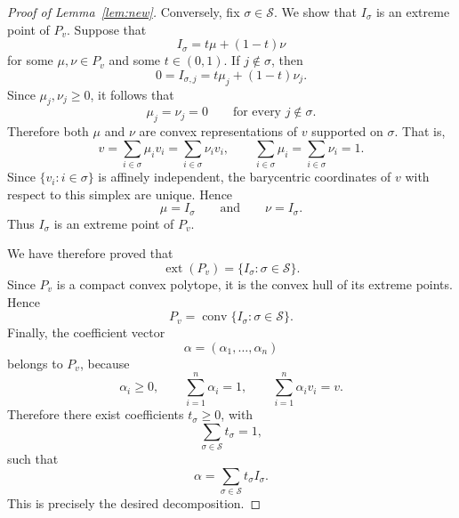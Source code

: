\documentclass[10pt]{amsart}
\theoremstyle{plain}
\theoremstyle{definition}
\let\geq\geqslant
\begin{document}
\begin{proof}[Proof of Lemma~\ref{lem:new}]
Conversely, fix \(\sigma\in\mathcal S\). We show that \(I_\sigma\) is an
extreme point of \(P_v\). Suppose that
\[
I_\sigma=t\mu+(1-t)\nu
\]
for some \(\mu,\nu\in P_v\) and some \(t\in(0,1)\). If \(j\notin\sigma\),
then
\[
0=I_{\sigma,j}=t\mu_j+(1-t)\nu_j.
\]
Since \(\mu_j,\nu_j\geq 0\), it follows that
\[
\mu_j=\nu_j=0
\qquad
\text{for every } j\notin\sigma.
\]
Therefore both \(\mu\) and \(\nu\) are convex representations of \(v\)
supported on \(\sigma\). That is,
\[
v=\sum_{i\in\sigma} \mu_i v_i
=
\sum_{i\in\sigma} \nu_i v_i,
\qquad
\sum_{i\in\sigma}\mu_i
=
\sum_{i\in\sigma}\nu_i
=
1.
\]
Since \(\{v_i:i\in\sigma\}\) is affinely independent, the barycentric
coordinates of \(v\) with respect to this simplex are unique. Hence
\[
\mu=I_\sigma
\qquad\text{and}\qquad
\nu=I_\sigma.
\]
Thus \(I_\sigma\) is an extreme point of \(P_v\).

We have therefore proved that
\[
\operatorname{ext}(P_v)
=
\{I_\sigma:\sigma\in\mathcal S\}.
\]
Since \(P_v\) is a compact convex polytope, it is the convex hull of its
extreme points. Hence
\[
P_v
=
\operatorname{conv}\{I_\sigma:\sigma\in\mathcal S\}.
\]
Finally, the coefficient vector
\[
\alpha=(\alpha_1,\ldots,\alpha_n)
\]
belongs to \(P_v\), because
\[
\alpha_i\geq 0,\qquad \sum_{i=1}^n\alpha_i=1,
\qquad
\sum_{i=1}^n\alpha_i v_i=v.
\]
Therefore there exist coefficients \(t_\sigma\geq 0\), with
\[
\sum_{\sigma\in\mathcal S} t_\sigma=1,
\]
such that
\[
\alpha=\sum_{\sigma\in\mathcal S} t_\sigma I_\sigma.
\]
This is precisely the desired decomposition.
\end{proof}
\end{document}
